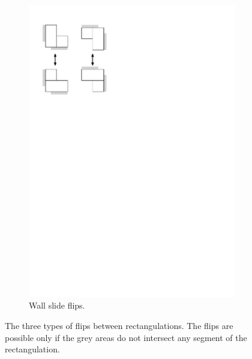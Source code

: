 \documentclass{amsart}
\theoremstyle{definition}
\begin{document}
\begin{figure}
\begin{center}
\begin{subfigure}{0.3\textwidth}
\begin{center}
    \includegraphics[page=3, scale=.5]{flipGraph.pdf}
    \caption{\label{fig:wallSlides}Wall slide flips.}
    \end{center}
    \end{subfigure}
    \end{center}
	\caption{The three types of flips between rectangulations. The flips are possible only if the grey areas do not intersect any segment of the rectangulation. \cite[Fig.~19]{ACFF24}}
	\label{fig:flips}
\end{figure}
\end{document}
